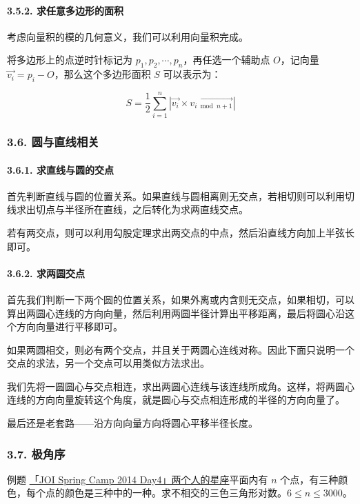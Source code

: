 \paragraph{3.5.2. 求任意多边形的面积}

考虑向量积的模的几何意义，我们可以利用向量积完成。

将多边形上的点逆时针标记为 $p_1,p_2,\cdots ,p_n$，再任选一个辅助点 $O$，记向量 $\vec {v_i}=p_i-O$，那么这个多边形面积 $S$ 可以表示为：

$$
S=\frac{1}{2}\sum_{i=1}^n |\vec {v_i}\times \overrightarrow{v_{i\bmod n+1}}|
$$

\subsubsection{3.6. 圆与直线相关}

\paragraph{3.6.1. 求直线与圆的交点}

首先判断直线与圆的位置关系。如果直线与圆相离则无交点，若相切则可以利用切线求出切点与半径所在直线，之后转化为求两直线交点。

若有两交点，则可以利用勾股定理求出两交点的中点，然后沿直线方向加上半弦长即可。

\paragraph{3.6.2. 求两圆交点}

首先我们判断一下两个圆的位置关系，如果外离或内含则无交点，如果相切，可以算出两圆心连线的方向向量，然后利用两圆半径计算出平移距离，最后将圆心沿这个方向向量进行平移即可。

如果两圆相交，则必有两个交点，并且关于两圆心连线对称。因此下面只说明一个交点的求法，另一个交点可以用类似方法求出。

我们先将一圆圆心与交点相连，求出两圆心连线与该连线所成角。这样，将两圆心连线的方向向量旋转这个角度，就是圆心与交点相连形成的半径的方向向量了。

最后还是老套路——沿方向向量方向将圆心平移半径长度。

\subsubsection{3.7. 极角序}

\begin{NOTE}{例题}{}
\href{https://www.ioi-jp.org/camp/2014/2014-sp-tasks/2014-sp-d4.pdf}{「JOI Spring Camp 2014 Day4」两个人的星座}平面内有 $n$ 个点，有三种颜色，每个点的颜色是三种中的一种。求不相交的三色三角形对数。$6\le n\le 3000$。
\end{NOTE}


